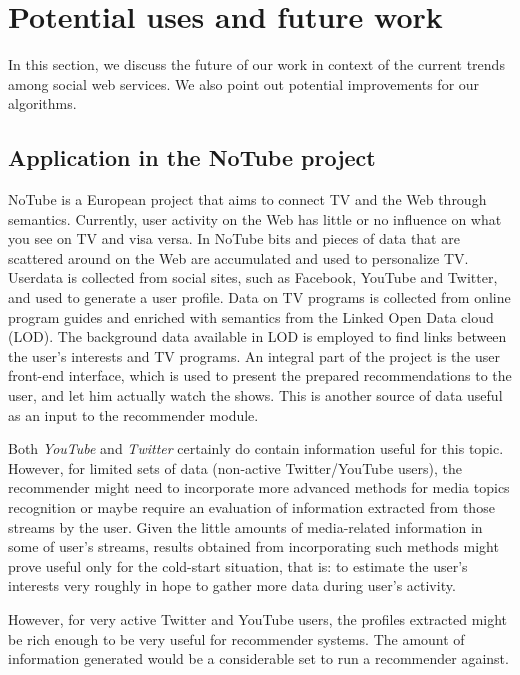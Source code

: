 \section{Potential uses and future work}

In this section, we discuss the future of our work in context of the current
trends among social web services. We also point out potential improvements for
our algorithms.

\subsection{Application in the NoTube project}

NoTube is a European project that aims to connect TV and the Web through
semantics. Currently, user activity on the Web has little or no influence on
what you see on TV and visa versa. In NoTube bits and pieces of data that are
scattered around on the Web are accumulated and used to personalize TV. Userdata
is collected from social sites, such as Facebook, YouTube and Twitter, and used
to generate a user profile. Data on TV programs is collected from online program
guides and enriched with semantics from the Linked Open Data cloud (LOD). The
background data available in LOD is employed to find links between the user's
interests and TV programs. An integral part of the project is the user front-end
interface, which is used to present the prepared recommendations to the user,
and let him actually watch the shows. This is another source of data useful as
an input to the recommender module.

Both \textit{YouTube} and \textit{Twitter} certainly do contain information
useful for this topic. However, for limited sets of data (non-active
Twitter/YouTube users), the recommender might need to 
incorporate more advanced methods for media topics recognition or maybe require
an evaluation of information extracted from those streams by the user.
Given the little amounts of media-related information in some of user's
streams, results obtained from incorporating such methods might prove useful
only for the cold-start situation, that is: to estimate the user's interests
very roughly in hope to gather more data during user's activity.

However, for very active Twitter and YouTube users, the profiles extracted
might be rich enough to be very useful for recommender systems. The amount of
information generated would be a considerable set to run a recommender against.

